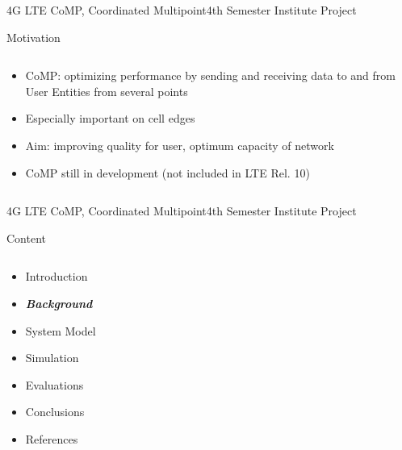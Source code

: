 \documentclass[xcolor={cmyk}]{beamer}
\begin{document}
 \begin{frame}{4G LTE CoMP, Coordinated Multipoint}{4th Semester Institute Project}
	 \begin{block}{Motivation}
	 	\begin{columns}
			\begin{column}{.9\textwidth}
				\begin{itemize}
					\item CoMP: optimizing performance by sending and receiving data to and from User Entities from several points
					\item Especially important on cell edges
					\item Aim: improving quality for user, optimum capacity of network 
					\item CoMP still in development (not included in LTE Rel. 10)
				\end{itemize}
			\end{column}
		\end{columns}
	 \end{block}
 \end{frame}
 
\begin{frame}{4G LTE CoMP, Coordinated Multipoint}{4th Semester Institute Project}
	\begin{block}{Content}
		\begin{columns}
			\begin{column}{.9\textwidth}
				\begin{itemize}
					\item Introduction
					\item \textbf{\emph{Background}}
					\item System Model
					\item Simulation
					\item Evaluations
					\item Conclusions
					\item References
				\end{itemize}
			\end{column}
		\end{columns}
	\end{block}
\end{frame}

\end{document}
